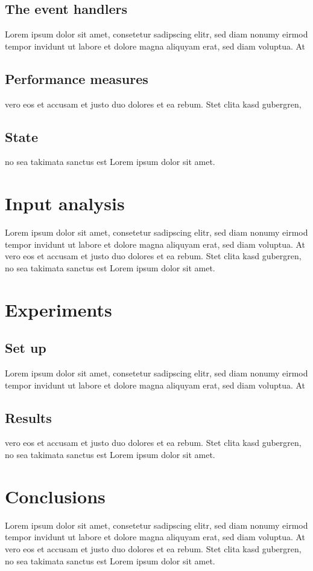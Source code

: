 \documentclass{article}
\begin{document}
        \subsection{The event handlers}
            Lorem ipsum dolor sit amet, consetetur sadipscing elitr, sed diam nonumy eirmod
            tempor invidunt ut labore et dolore magna aliquyam erat, sed diam voluptua. At
        \subsection{Performance measures}
            vero eos et accusam et justo duo dolores et ea rebum. Stet clita kasd gubergren,
        \subsection{State}
            no sea takimata sanctus est Lorem ipsum dolor sit amet.
        
    

    \section{Input analysis}
        Lorem ipsum dolor sit amet, consetetur sadipscing elitr, sed diam nonumy eirmod
        tempor invidunt ut labore et dolore magna aliquyam erat, sed diam voluptua. At
        vero eos et accusam et justo duo dolores et ea rebum. Stet clita kasd gubergren,
        no sea takimata sanctus est Lorem ipsum dolor sit amet.


    \section{Experiments}
    \subsection{Set up}
        Lorem ipsum dolor sit amet, consetetur sadipscing elitr, sed diam nonumy eirmod
        tempor invidunt ut labore et dolore magna aliquyam erat, sed diam voluptua. At

    \subsection{Results}
        vero eos et accusam et justo duo dolores et ea rebum. Stet clita kasd gubergren,
        no sea takimata sanctus est Lorem ipsum dolor sit amet.
    
    
    \section{Conclusions}
        Lorem ipsum dolor sit amet, consetetur sadipscing elitr, sed diam nonumy eirmod
        tempor invidunt ut labore et dolore magna aliquyam erat, sed diam voluptua. At
        vero eos et accusam et justo duo dolores et ea rebum. Stet clita kasd gubergren,
        no sea takimata sanctus est Lorem ipsum dolor sit amet.
    
\end{document}
